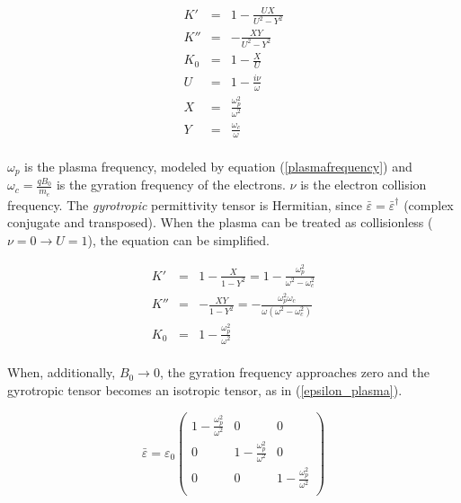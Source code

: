 \documentclass[a4paper,10pt]{thesis}
\begin{document}
\begin{eqnarray}
  K' &=& 1-\frac{UX}{U^2-Y^2} \\
K'' &=&- \frac{XY}{U^2-Y^2} \\
K_0 &=& 1-\frac{X}{U} \\
U &=&  1-\frac{i\nu}{\omega}\\
X &=&  \frac{\omega_p^2}{\omega^2}\\
Y &=& \frac{\omega_c}{\omega}
\end{eqnarray}

\paragraph*{}
$\omega_p$ is the plasma frequency, modeled by equation (\ref{plasmafrequency}) and $\omega_c=\frac{qB_0}{m_e}$ is the gyration frequency of the electrons. $\nu$ is the electron collision frequency. The \emph{gyrotropic} permittivity tensor is Hermitian, since $\bar{\varepsilon}=\bar{\varepsilon}^\dag$ (complex conjugate and transposed). When the plasma can be treated as collisionless ($\nu=0\rightarrow U=1$), the equation can be simplified.

\begin{eqnarray}
  K' &=& 1-\frac{X}{1-Y^2} = 1-\frac{\omega_p^2}{\omega^2-\omega_c^2}\\
K'' &=& -\frac{XY}{1-Y^2} = -\frac{\omega_p^2 \omega_c}{\omega(\omega^2-\omega_c^2)}\\
K_0 &=& 1-\frac{\omega_p^2}{\omega^2}
\end{eqnarray}

\paragraph*{}
When, additionally, $B_0\rightarrow 0$, the gyration frequency approaches zero and the gyrotropic tensor becomes an isotropic tensor, as in (\ref{epsilon_plasma}).

\begin{equation}\label{isotropic_tensor}
    \bar{\varepsilon}=\varepsilon_0\left(%
\begin{array}{ccc}
  1-\frac{\omega_p^2}{\omega^2} & 0 & 0 \\
0 & 1-\frac{\omega_p^2}{\omega^2} & 0 \\
0 & 0 & 1-\frac{\omega_p^2}{\omega^2} \\\end{array}%
\right)
\end{equation}
\end{document}
